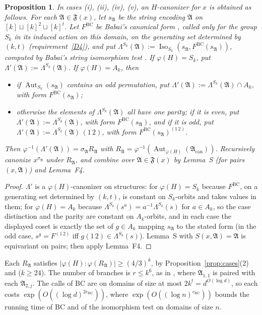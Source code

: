 \documentclass[11pt]{article}
\theoremstyle{plain}
\newtheorem{proposition}[theorem]{Proposition}
\theoremstyle{definition}
\theoremstyle{remark}
\theoremstyle{named}
\theoremstyle{namedrm}
\newcommand{\Aut}{\operatorname{Aut}}
\newcommand{\Iso}{\operatorname{Iso}}
\newcommand{\fA}{\mathfrak{A}}
\newcommand{\fF}{\mathfrak{F}}
\begin{document}
\begin{proposition}\label{prop:opt1}
In cases (i), (ii), (iv), (v), an $H$-canonizer for $x$ is obtained as follows. For each $\fA\in\fF(x)$, let
$s_\fA$ be the string encoding $\fA$ on $[k]\sqcup[k]^2\sqcup[k]^t$. Let $F^{\mathrm{BC}}$ be Babai's canonical form
\cite[Thm.~2.2]{Bab19}, called only for the group $S_k$ in its induced action on this domain, on the
generating set determined by $(k,t)$ (requirement~\ref{D4}), and put
$\Lambda^{S_k}(\fA):=\Iso_{S_k}(s_\fA,F^{\mathrm{BC}}(s_\fA))$, computed by Babai's string isomorphism test
\cite[Thm.~2.1]{Bab19}. If $\varphi(H)=S_k$, put $\Lambda'(\fA):=\Lambda^{S_k}(\fA)$. If $\varphi(H)=A_k$, then
\begin{itemize}
\item if $\Aut_{S_k}(s_\fA)$ contains an odd permutation, put $\Lambda'(\fA):=\Lambda^{S_k}(\fA)\cap A_k$, with form
  $F^{\mathrm{BC}}(s_\fA)$;
\item otherwise the elements of $\Lambda^{S_k}(\fA)$ all have one parity; if it is even, put
  $\Lambda'(\fA):=\Lambda^{S_k}(\fA)$, with form $F^{\mathrm{BC}}(s_\fA)$, and if it is odd, put
  $\Lambda'(\fA):=\Lambda^{S_k}(\fA)\,(1\,2)$, with form $F^{\mathrm{BC}}(s_\fA)^{(1\,2)}$.
\end{itemize}
Then $\varphi^{-1}(\Lambda'(\fA))=\sigma_\fA R_\fA$ with
$R_\fA=\varphi^{-1}(\Aut_{\varphi(H)}(\fA_{\mathrm{can}}))$. Recursively canonize $x^{\sigma_\fA}$ under $R_\fA$, and
combine over $\fA\in\fF(x)$ by Lemma~S (for pairs $(x,\fA)$) and Lemma~F4.
\end{proposition}
\begin{proof}
$\Lambda'$ is a $\varphi(H)$-canonizer on structures: for $\varphi(H)=S_k$ because $F^{\mathrm{BC}}$, on a generating set
determined by $(k,t)$, is constant on $S_k$-orbits and takes values in them; for $\varphi(H)=A_k$ because
$\Lambda^{S_k}(s^a)=a^{-1}\Lambda^{S_k}(s)$ for $a\in A_k$, so the case distinction and the parity are constant on
$A_k$-orbits, and in each case the displayed coset is exactly the set of $g\in A_k$ mapping $s_\fA$ to the stated
form (in the odd case, $s^g=F^{(1\,2)}$ iff $g(1\,2)\in\Lambda^{S_k}(s)$). Lemma~S with $S(x,\fA)=\fA$ is equivariant
on pairs; then apply Lemma~F4.
\end{proof}
Each $R_\fA$ satisfies $|\varphi(H):\varphi(R_\fA)|\ge(4/3)^k$, by Proposition~\ref{prop:cases}(2) and
\cite[Cor.~6.5]{GNS} ($k\ge24$). The number of branches is $r\le k^6$, as in \cite[Lemma~6.7]{GNS}, where
$\fA_{1,1}$ is paired with each $\fA_{2,j}$. The calls of BC are on domains of size at most $2k^t=d^{O(\log d)}$,
so each costs $\exp(O((\log d)^{2c_{\mathrm{BC}}}))$, where $\exp(O((\log n)^{c_{\mathrm{BC}}}))$ bounds the running time
of BC and of the isomorphism test \cite[Thm.~2.1]{Bab19} on domains of size $n$.
\end{document}
